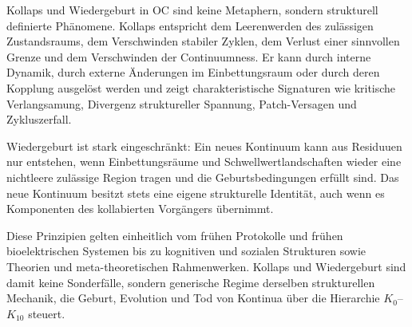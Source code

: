 Kollaps und Wiedergeburt in OC sind keine Metaphern, sondern strukturell
definierte Phänomene. Kollaps entspricht dem Leerenwerden des zulässigen
Zustandsraums, dem Verschwinden stabiler Zyklen, dem Verlust einer sinnvollen
Grenze und dem Verschwinden der Continuumness. Er kann durch interne Dynamik,
durch externe Änderungen im Einbettungsraum oder durch deren Kopplung ausgelöst
werden und zeigt charakteristische Signaturen wie kritische Verlangsamung,
Divergenz struktureller Spannung, Patch-Versagen und Zykluszerfall.

Wiedergeburt ist stark eingeschränkt: Ein neues Kontinuum kann aus Residuuen nur
entstehen, wenn Einbettungsräume und Schwellwertlandschaften wieder eine
nichtleere zulässige Region tragen und die Geburtsbedingungen erfüllt sind. Das
neue Kontinuum besitzt stets eine eigene strukturelle Identität, auch wenn es
Komponenten des kollabierten Vorgängers übernimmt.

Diese Prinzipien gelten einheitlich vom frühen Protokolle und frühen
bioelektrischen Systemen bis zu kognitiven und sozialen Strukturen sowie
Theorien und meta-theoretischen Rahmenwerken. Kollaps und Wiedergeburt sind
damit keine Sonderfälle, sondern generische Regime derselben strukturellen
Mechanik, die Geburt, Evolution und Tod von Kontinua über die Hierarchie
\(K_0\)–\(K_{10}\) steuert.




